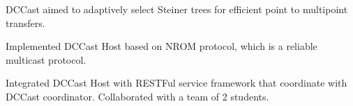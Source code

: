 \protitle
{
}
{
}
{}
\begin{cventry}
  \item DCCast aimed to adaptively select Steiner trees for efficient point to multipoint transfers.
  \item Implemented DCCast Host based on NROM protocol, which is a reliable multicast protocol.
  \item Integrated DCCast Host with RESTFul service framework that coordinate with DCCast coordinator. Collaborated with a team of 2 students.
\end{cventry}